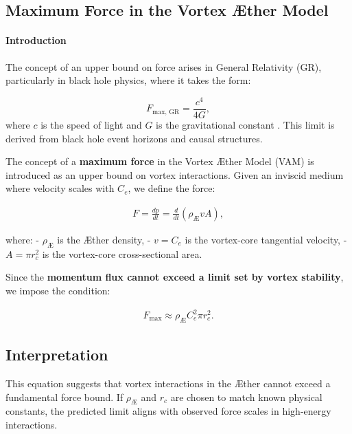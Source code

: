

\subsection{Maximum Force in the Vortex \AE ther Model}


\paragraph*{Introduction}
The concept of an upper bound on force arises in General Relativity (GR), particularly in black hole physics, where it takes the form:


\begin{equation*}
    F_{\text{max, GR}} = \frac{c^4}{4G},
\end{equation*}
where $c$ is the speed of light and $G$ is the gravitational constant \cite{Schiller2006}. This limit is derived from black hole event horizons and causal structures.


The concept of a \textbf{maximum force} in the Vortex Æther Model (VAM) is introduced as an upper bound on vortex interactions. Given an inviscid medium where velocity scales with \( C_e \), we define the force:

\begin{align}
    F = \frac{dp}{dt} = \frac{d}{dt} (\rho_{\!Æ} v A),
\end{align}

where:
- \( \rho_{\!Æ} \) is the Æther density,
- \( v = C_e \) is the vortex-core tangential velocity,
- \( A = \pi r_c^2 \) is the vortex-core cross-sectional area.

Since the \textbf{momentum flux cannot exceed a limit set by vortex stability}, we impose the condition:

\begin{align}
    F_{\max} \approx \rho_{\!Æ} C_e^2 \pi r_c^2.
\end{align}

\subsection{Interpretation}

This equation suggests that vortex interactions in the Æther cannot exceed a fundamental force bound. If \( \rho_{\!Æ} \) and \( r_c \) are chosen to match known physical constants, the predicted limit aligns with observed force scales in high-energy interactions.

